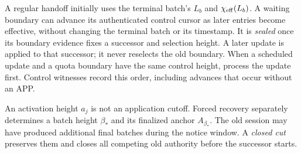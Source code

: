 \documentclass[11pt,a4paper,onecolumn]{article}
\begin{document}
A regular handoff initially uses the terminal batch's $L_b$ and
$\chi_{\rm eff}(L_b)$. A waiting boundary can advance its authenticated
control cursor as later entries become effective, without changing the
terminal batch or its timestamp. It is \emph{sealed} once its boundary
evidence fixes a successor and selection height. A later update is applied
to that successor; it never reselects the old boundary. When a scheduled
update and a quota boundary have the same control height, process the
update first. Control witnesses record this order, including advances
that occur without an APP.

An activation height $a_j$ is not an application cutoff. Forced recovery
separately determines a batch height $\beta_*$ and its finalized anchor
$A_{\beta_*}$. The old session may have produced additional final batches
during the notice window. A \emph{closed cut} preserves them and closes all
competing old authority before the successor starts.
\end{document}
